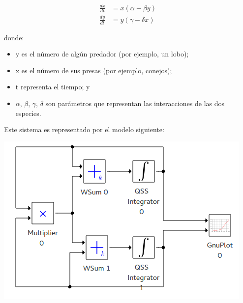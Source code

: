 \begin{align*}
\frac{dx}{dt} & = x(\alpha - \beta y)\\
\frac{dy}{dt} & =y(\gamma - \delta  x)
\end{align*}

donde:
\begin{itemize}
	\item y es el número de algún predador (por ejemplo, un lobo);
    \item x es el número de sus presas (por ejemplo, conejos);
    \item t representa el tiempo; y
    \item $\alpha$, $\beta$, $\gamma$, $\delta$ son parámetros que representan las interacciones de las dos especies.
\end{itemize}

	Este sistema es representado por el modelo siguiente:

\includegraphics[width=0.75\linewidth]{lotka_voltera_pwd}

